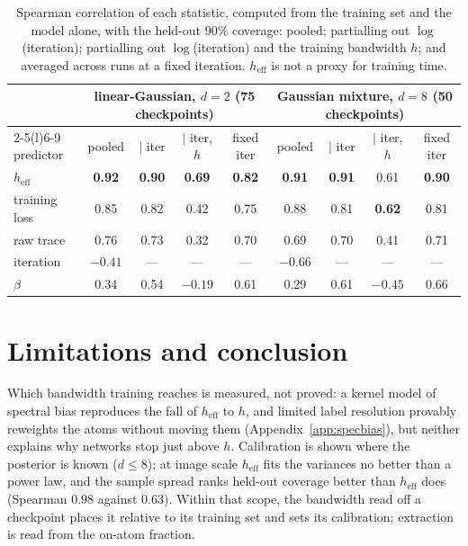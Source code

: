 \documentclass{article}
\theoremstyle{plain}
\theoremstyle{remark}
\begin{document}
\begin{table}[t]
\centering\small
\setlength{\tabcolsep}{4pt}
\begin{tabular}{lcccccccc}
\toprule
& \multicolumn{4}{c}{linear-Gaussian, $d{=}2$ (75 checkpoints)} &
\multicolumn{4}{c}{Gaussian mixture, $d{=}8$ (50 checkpoints)}\\
\cmidrule(lr){2-5}\cmidrule(l){6-9}
predictor & pooled & $\mid$ iter & $\mid$ iter, $h$ & fixed iter &
pooled & $\mid$ iter & $\mid$ iter, $h$ & fixed iter\\
\midrule
$h_{\mathrm{eff}}$ & \textbf{0.92} & \textbf{0.90} & \textbf{0.69} & \textbf{0.82} &
\textbf{0.91} & \textbf{0.91} & 0.61 & \textbf{0.90}\\
training loss & 0.85 & 0.82 & 0.42 & 0.75 & 0.88 & 0.81 & \textbf{0.62} & 0.81\\
raw trace & 0.76 & 0.73 & 0.32 & 0.70 & 0.69 & 0.70 & 0.41 & 0.71\\
iteration & $-0.41$ & --- & --- & --- & $-0.66$ & --- & --- & ---\\
$\beta$ & 0.34 & 0.54 & $-0.19$ & 0.61 & 0.29 & 0.61 & $-0.45$ & 0.66\\
\bottomrule
\end{tabular}
\caption{Spearman correlation of each statistic, computed from the training set and
the model alone, with the held-out 90\% coverage: pooled; partialling out
$\log$(iteration); partialling out $\log$(iteration) and the training bandwidth $h$;
and averaged across runs at a fixed iteration. $h_{\mathrm{eff}}$ is not a proxy for
training time.}
\label{tab:baselines}
\end{table}

\section{Limitations and conclusion}

Which bandwidth training reaches is measured, not proved: a kernel model of spectral bias
reproduces the fall of $h_{\mathrm{eff}}$ to $h$, and limited label resolution provably
reweights the atoms without moving them (Appendix~\ref{app:specbias}), but neither
explains why networks stop just above $h$. Calibration is shown where the posterior is
known ($d\le8$); at image scale $h_{\mathrm{eff}}$ fits the variances no better than a
power law, and the sample spread ranks held-out coverage better than $h_{\mathrm{eff}}$
does (Spearman $0.98$ against $0.63$). Within that scope, the bandwidth read off a
checkpoint places it relative to its training set and sets its calibration; extraction
is read from the on-atom fraction.
\end{document}
